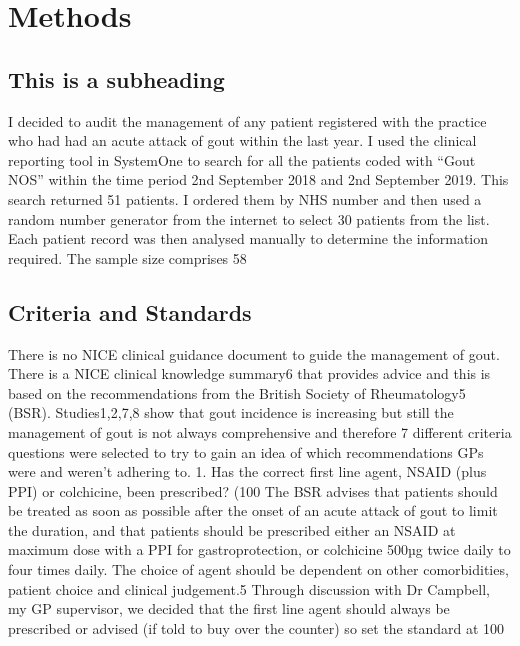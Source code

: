 \documentclass[paper=a4,fontsize=11pt,twocolumn]{article}
\begin{document}
\section{Methods}
\label{methods}
\subsection{This is a subheading}
I decided to audit the management of any patient registered with the practice who had had an acute attack of gout within the last year. I used the clinical reporting tool in SystemOne to search for all the patients coded with “Gout NOS” within the time period 2nd September 2018 and 2nd September 2019. This search returned 51 patients.
I ordered them by NHS number and then used a random number generator from the internet to select 30 patients from the list. Each patient record was then analysed manually to determine the information required. 
The sample size comprises 58%


\subsection{Criteria and Standards}
There is no NICE clinical guidance document to guide the management of gout. There is a NICE clinical knowledge summary6 that provides advice and this is based on the recommendations from the British Society of Rheumatology5 (BSR). Studies1,2,7,8 show that gout incidence is increasing but still the management of gout is not always comprehensive and therefore 7 different criteria questions were selected to try to gain an idea of which recommendations GPs were and weren’t adhering to. 
1.	Has the correct first line agent, NSAID (plus PPI) or colchicine, been prescribed? (100%
The BSR advises that patients should be treated as soon as possible after the onset of an acute attack of gout to limit the duration, and that patients should be prescribed either an NSAID at maximum dose with a PPI for gastroprotection, or colchicine 500µg twice daily to four times daily. The choice of agent should be dependent on other comorbidities, patient choice and clinical judgement.5
Through discussion with Dr Campbell, my GP supervisor, we decided that the first line agent should always be prescribed or advised (if told to buy over the counter) so set the standard at 100%
\end{document}
